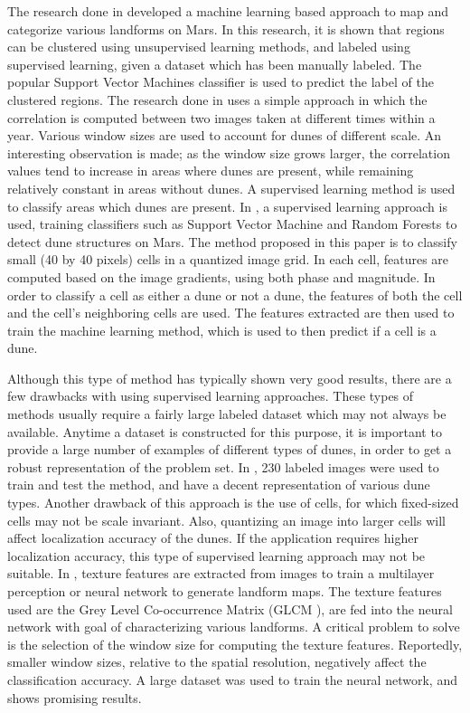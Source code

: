 The research done in \cite{2007_Machine_Learning_tools_automatic_mapping_mars} developed a machine learning based approach to map and categorize various landforms on Mars. In this research, it is shown that regions can be clustered using unsupervised learning methods, and labeled using supervised learning, given a dataset which has been manually labeled. The popular Support Vector Machines classifier is used to predict the label of the clustered regions. The research done in \cite{2013_sar_image_automated_detection_dune_area} uses a simple approach in which the correlation is computed between two images taken at different times within a year. Various window sizes are used to account for dunes of different scale. An interesting observation is made; as the window size grows larger, the correlation values tend to increase in areas where dunes are present, while remaining relatively constant in areas without dunes. A supervised learning method is used to classify areas which dunes are present. In \cite{BandeiraMarques}, a supervised learning approach is used, training classifiers such as Support Vector Machine and Random Forests to detect dune structures on Mars. The method proposed in this paper is to classify small (40 by 40 pixels) cells in a quantized image grid. In each cell, features are computed based on the image gradients, using both phase and magnitude. In order to classify a cell as either a dune or not a dune, the features of both the cell and the cell's neighboring cells are used. The features extracted are then used to train the machine learning method, which is used to then predict if a cell is a dune.

Although this type of method has typically shown very good results, there are a few drawbacks with using supervised learning approaches. These types of methods usually require a fairly large labeled dataset which may not always be available. Anytime a dataset is constructed for this purpose, it is important to provide a large number of examples of different types of dunes, in order to get a robust representation of the problem set. In \cite{BandeiraMarques}, 230 labeled images were used to train and test the method, and have a decent representation of various dune types. Another drawback of this approach is the use of cells, for which fixed-sized cells may not be scale invariant. Also, quantizing an image into larger cells	will affect localization accuracy of the dunes. If the application requires higher localization accuracy, this type of supervised learning approach may not be suitable. In \cite{2011_neural_network_based_dunal_landform_mapping}, texture features are extracted from images to train a multilayer perception or neural network to generate landform maps. The texture features used are the Grey Level Co-occurrence Matrix (GLCM \cite{1973_textural_features_image_classification}), are fed into the neural network with goal of characterizing various landforms. A critical problem to solve is the selection of the window size for computing the texture features. Reportedly, smaller window sizes, relative to the spatial resolution, negatively affect the classification accuracy. A large dataset was used to train the neural network, and shows promising results.

